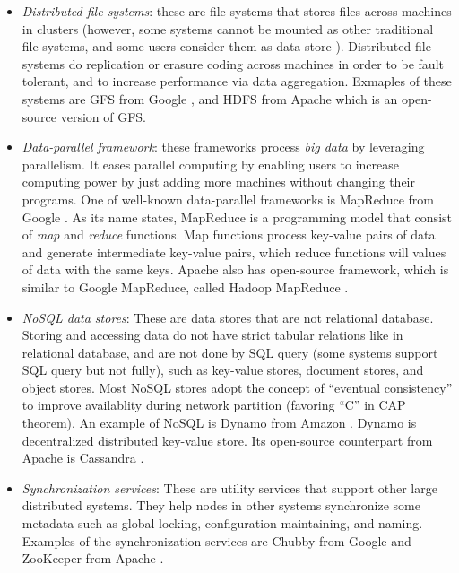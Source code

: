 \begin{itemize}

\item \textit{Distributed file systems}: these are file systems that stores
files across machines in clusters (however, some systems cannot be mounted as
other traditional file systems, and some users consider them as data store
\cite{HadoopStorage}). Distributed file systems do replication or erasure coding
across machines in order to be fault tolerant, and to increase performance via
data aggregation. Exmaples of these systems are GFS from Google
\cite{Ghemawat+03-GoogleFS}, and HDFS from Apache \cite{Shvachko+10-HDFSPaper}
which is an open-source version of GFS.

\item \textit{Data-parallel framework}: these frameworks process \textit{big
data} by leveraging parallelism. It eases parallel computing by enabling users
to increase computing power by just adding more machines without changing their
programs.  One of well-known data-parallel frameworks is MapReduce from Google
\cite{DeanGhemawat04-MapReduce}.  As its name states, MapReduce is a
programming model that consist of \textit{map} and \textit{reduce} functions.
Map functions process key-value pairs of data and generate intermediate
key-value pairs, which reduce functions will values of data with the same keys.
Apache also has open-source framework, which is similar to Google MapReduce,
called Hadoop MapReduce \cite{HadoopWeb}.

\item \textit{NoSQL data stores}: These are data stores that are not relational
database. Storing and accessing data do not have strict tabular relations like
in relational database, and are not done by SQL query (some systems support SQL
query but not fully), such as key-value stores, document stores, and object
stores. Most NoSQL stores adopt the concept of ``eventual consistency'' to
improve availablity during network partition (favoring ``C'' in CAP theorem). An
example of NoSQL is Dynamo from Amazon \cite{DeCandia+07-Dynamo}. Dynamo is
decentralized distributed key-value store. Its open-source counterpart from
Apache is Cassandra \cite{Lakshman+09-Cassandra}.

\item \textit{Synchronization services}: These are utility services that support
other large distributed systems. They help nodes in other systems synchronize
some metadata such as global locking, configuration maintaining, and naming.
Examples of the synchronization services are Chubby from Google
\cite{Burrows06-Chubby} and ZooKeeper from Apache \cite{Hunt+10-ZooKeeperPaper}.

\end{itemize}
